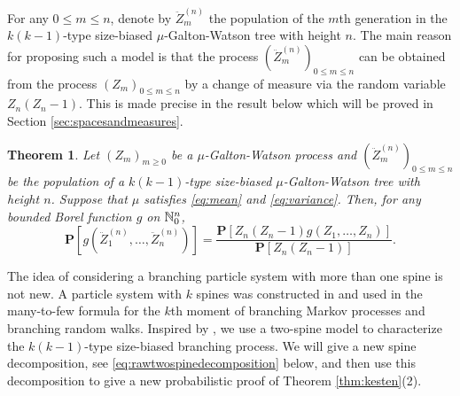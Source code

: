 \documentclass[12pt]{amsart}
\newtheorem{thm}{Theorem}[section]
\numberwithin{equation}{section}
\newcommand{\prob}{\mathbf P}
\newcommand{\expr}[1]{\left( #1 \right)}
\newcommand{\brac}[1]{\left[ #1 \right]}
\begin{document}
\par	
	For any $0\le m \le n$, denote by $\ddot Z_m^{(n)}$ the population of the $m$th generation in the $k(k-1)$-type size-biased $\mu$-Galton-Watson tree with height $n$.
	The main reason for proposing such a model is that the process $(\ddot Z_m^{(n)})_{0\le m\le n}$ can be obtained from the process $(Z_m)_{0\le m\le n}$ by a change of measure via the random variable $Z_n(Z_n-1)$.
	This is made precise in the result below which will be proved in Section \ref{sec:spacesandmeasures}.
\begin{thm}
\label{thm:changeofmeasure}
	Let $(Z_m)_{m\ge 0}$ be a $\mu$-Galton-Watson process and $(\ddot Z_m^{(n)})_{0\le m\le n}$ be the population of a $k(k-1)$-type size-biased $\mu$-Galton-Watson tree with height $n$.
	Suppose that $\mu$ satisfies \eqref{eq:mean} and \eqref{eq:variance}.
	Then, for any bounded Borel function $g$ on $\mathbb N^{n}_0$,
\begin{equation*}
		\prob\brac{g\expr{\ddot Z_1^{(n)},\dots,\ddot Z_n^{(n)}}}
	=
		\frac{\prob\brac{Z_n(Z_n-1) g\expr{Z_1,\dots, Z_n}}}{\prob\brac{Z_n(Z_n-1)}}.			
\end{equation*}
\end{thm}
\par
	The idea of considering a branching particle system with more than one spine is not new.
	A particle system with $k$ spines  was constructed in \cite{harris2015many} and used in the  many-to-few formula for the $k$th moment of branching Markov processes and branching random walks. 
	Inspired by \cite{harris2015many}, we use a two-spine model to characterize the $k(k-1)$-type size-biased branching process.
	We will give a new spine decomposition, see \eqref{eq:rawtwospinedecomposition} below, and then use this decomposition to give a new probabilistic proof of Theorem \ref{thm:kesten}(2).
\end{document}
